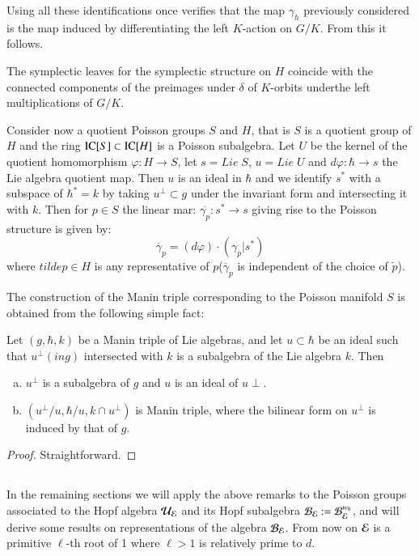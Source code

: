 Using all these identifications once verifies that the map $\gamma_{h}$ previously considered is the map induced by differentiating the left $K$-action on $G/K$. From this it follows.

\begin{prop*}
The symplectic leaves for the symplectic structure on $H$ coincide with the connected components of the preimages under $\delta$ of $K$-orbits under\pageoriginale the left multiplications of $G/K$.
\end{prop*}

Consider now a quotient Poisson groups $S$ and $H$, that is $S$ is a quotient group of $H$ and the ring $\operatorname{IC}[S] \subset \operatorname{IC}[H]$ is a Poisson subalgebra. Let $U$ be the kernel of the quotient homomorphism $\varphi: H \rightarrow S$, let $s= Lie\; S$, $u = Lie\; U$ and $d\varphi : \hbar \rightarrow s$ the Lie algebra quotient map. Then $u$ is an ideal in $\hbar$ and we identify $s^{*}$ with a subspace of $\hbar^{*} =k$ by taking $u^{\perp} \subset g$ under the invariant form and intersecting it with $k$. Then for $p\in S$ the linear mar: $\overline{\gamma_{p}}: s^{*} \rightarrow s$ giving rise to the Poisson structure is given by:
$$
\overline{\gamma}_{p} = (d\varphi) \cdot (\gamma_{\overline{p}} | s^{*})
$$
where $tilde{p} \in H$ is any representative of $p$($\overline{\gamma}_{p}$ is independent of the choice of $\tilde{p}$).

The construction of the Manin triple corresponding to the Poisson manifold $S$ is obtained from the following simple fact:

\begin{lemma*}
Let $(g, \hbar, k)$ be a Manin triple of Lie algebras, and let $u \subset \hbar$ be an ideal such that $u^{\perp}(in g)$ intersected with $k$ is a subalgebra of the Lie algebra $k$. Then
\begin{enumerate}[(a)]
\item $u^{\perp}$ is a subalgebra of $g$ and $u$ is an ideal of $u\perp$.\label{chap4-enum-l(a)}
\item $(u^{\perp}/u, \hbar/u, k\cap u^{\perp})$ is Manin triple, where the bilinear form on $u^{\perp}$ is induced by that of $g$.\label{chap4-enum-l(b)}
\end{enumerate}
\end{lemma*}

\begin{proof}
Straightforward.
\end{proof}

\subsection{}\label{chap4-subsec-4.3}
In the remaining sections we will apply the above remarks to the Poisson groups associated to the Hopf algebra $\mathcal{U}_{\mathcal{E}}$ and its Hopf subalgebra $\mathcal{B}_{\mathcal{E}}: = \mathcal{B}_{\mathcal{E}}^{w_{0}}$, and will derive some results on representations of the algebra $\mathcal{B}_{\mathcal{E}}$. From now on $\mathcal{E}$ is a primitive $\ell$-th root of 1 where $\ell > 1$ is relatively prime to $d$.

